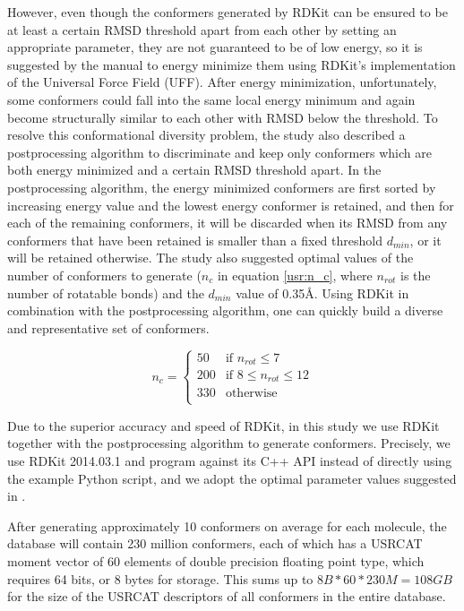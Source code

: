 However, even though the conformers generated by RDKit can be ensured to be at least a certain RMSD threshold apart from each other by setting an appropriate parameter, they are not guaranteed to be of low energy, so it is suggested by the manual to energy minimize them using RDKit’s implementation of the Universal Force Field (UFF). After energy minimization, unfortunately, some conformers could fall into the same local energy minimum and again become structurally similar to each other with RMSD below the threshold. To resolve this conformational diversity problem, the study \citep{1127} also described a postprocessing algorithm to discriminate and keep only conformers which are both energy minimized and a certain RMSD threshold apart. In the postprocessing algorithm, the energy minimized conformers are first sorted by increasing energy value and the lowest energy conformer is retained, and then for each of the remaining conformers, it will be discarded when its RMSD from any conformers that have been retained is smaller than a fixed threshold $d_{min}$, or it will be retained otherwise. The study \citep{1127} also suggested optimal values of the number of conformers to generate ($n_c$ in equation \eqref{usr:n_c}, where $n_{rot}$ is the number of rotatable bonds) and the $d_{min}$ value of 0.35\AA. Using RDKit in combination with the postprocessing algorithm, one can quickly build a diverse and representative set of conformers.

\begin{equation}
n_c=
\begin{cases}
 50 & \text{if } n_{rot} \leq 7\\
200 & \text{if } 8 \leq n_{rot} \leq 12\\
330 & \text{otherwise}\\
\end{cases}
\label{usr:n_c}
\end{equation}

Due to the superior accuracy and speed of RDKit, in this study we use RDKit together with the postprocessing algorithm to generate conformers. Precisely, we use RDKit 2014.03.1 and program against its C++ API instead of directly using the example Python script, and we adopt the optimal parameter values suggested in \citep{1127}.%

After generating approximately 10 conformers on average for each molecule, the database will contain 230 million conformers, each of which has a USRCAT moment vector of 60 elements of double precision floating point type, which requires 64 bits, or 8 bytes for storage. This sums up to $8B*60*230M=108GB$ for the size of the USRCAT descriptors of all conformers in the entire database.

